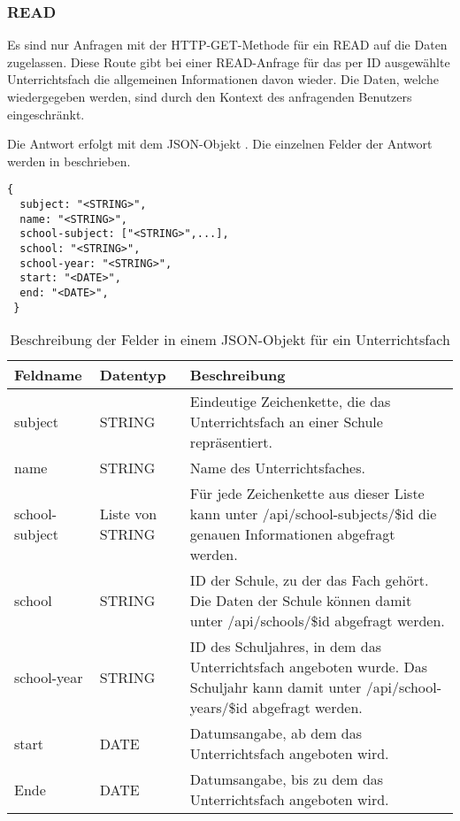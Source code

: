 \subsubsection{READ}
\label{sec:rest:api:subjects:id:read}
Es sind nur Anfragen mit der HTTP-GET-Methode für ein READ auf die Daten zugelassen.
Diese Route gibt bei einer READ-Anfrage für das per ID ausgewählte Unterrichtsfach die allgemeinen Informationen davon wieder.
Die Daten, welche wiedergegeben werden, sind durch den Kontext des anfragenden Benutzers eingeschränkt.

Die Antwort erfolgt mit dem JSON-Objekt . 
Die einzelnen Felder der Antwort werden in  beschrieben.


\begin{lstlisting}[caption={JSON-Antwort für einen GET-Aufruf des Pfads /api/subjects/\$id},label={lst:code:rest:api:subjects:id:read:ret},frame=tlrb]
 {
  subject: "<STRING>",
  name: "<STRING>",
  school-subject: ["<STRING>",...], 
  school: "<STRING>",
  school-year: "<STRING>",
  start: "<DATE>",
  end: "<DATE>",
 }
\end{lstlisting}

\begin{longtable}{|p{}|p{}|p{}|}
		\caption{Beschreibung der Felder in einem JSON-Objekt für ein Unterrichtsfach}
\endfoot
		\caption{Beschreibung der Felder in einem JSON-Objekt für ein Unterrichtsfach}
		\label{tab:rest:api:subjects:id:read:ret}
\endlastfoot 
\hline
			\textbf{Feldname} & \textbf{Datentyp} & \textbf{Beschreibung} \\ \hline
\endhead
subject & STRING & Eindeutige Zeichenkette, die das Unterrichtsfach an einer Schule repräsentiert.  \\ \hline
name & STRING & Name des Unterrichtsfaches. \\ \hline
school-subject & Liste von STRING & Für jede Zeichenkette aus dieser Liste kann unter /api/school-subjects/\$id die genauen Informationen abgefragt werden. \\ \hline
school & STRING & ID der Schule, zu der das Fach gehört. Die Daten der Schule können damit unter /api/schools/\$id abgefragt werden. \\ \hline
school-year & STRING & ID des Schuljahres, in dem das Unterrichtsfach angeboten wurde. Das Schuljahr kann damit unter /api/school-years/\$id abgefragt werden. \\ \hline
start & DATE & Datumsangabe, ab dem das Unterrichtsfach angeboten wird.  \\ \hline
Ende & DATE & Datumsangabe, bis zu dem das Unterrichtsfach angeboten wird. \\ \hline
\end{longtable}
